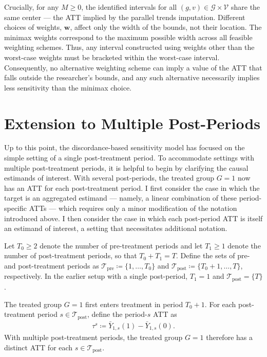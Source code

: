 \documentclass[twoside,11pt]{article}
\begin{document}
Crucially, for any $M \geq 0$, the identified intervals for all $(g,v) \in \mathcal{G} \times \mathcal{V}$ share the same center --- the \textrm{ATT} implied by the parallel trends imputation. Different choices of weights, $\bm{w}$, affect only the width of the bounds, not their location. The minimax weights correspond to the maximum possible width across all feasible weighting schemes. Thus, any interval constructed using weights other than the worst-case weights must be bracketed within the worst-case interval. Consequently, no alternative weighting scheme can imply a value of the \textrm{ATT} that falls outside the researcher's bounds, and any such alternative necessarily implies less sensitivity than the minimax choice.

\section{Extension to Multiple Post-Periods}  \label{sec: multiple post periods}

Up to this point, the discordance-based sensitivity model has focused on the simple setting of a single post-treatment period. To accommodate settings with multiple post-treatment periods, it is helpful to begin by clarifying the causal estimands of interest. With several post-periods, the treated group $G = 1$ now has an \textrm{ATT} for each post-treatment period. I first consider the case in which the target is an aggregated estimand --- namely, a linear combination of these period-specific \textrm{ATT}s --- which requires only a minor modification of the notation introduced above. I then consider the case in which each post-period \textrm{ATT} is itself an estimand of interest, a setting that necessitates additional notation.

Let $T_0 \geq 2$ denote the number of pre-treatment periods and let $T_1 \geq 1$ denote the number of post-treatment periods, so that $T_0 + T_1 = T$. Define the sets of pre- and post-treatment periods as $\mathcal{T}_{\mathrm{pre}} \coloneqq \{1, \ldots, T_0\}$ and $\mathcal{T}_{\mathrm{post}} \coloneqq \{T_0 + 1, \ldots, T\}$, respectively. In the earlier setup with a single post-period, $T_1 = 1$ and $\mathcal{T}_{\mathrm{post}} = \{T\}$.

The treated group $G = 1$ first enters treatment in period $T_0 + 1$. For each post-treatment period $s \in \mathcal{T}_{\mathrm{post}}$, define the period-$s$ \textrm{ATT} as
\begin{align}
\tau^s \coloneqq \bar{Y}_{1,s}(1) - \bar{Y}_{1,s}(0).
\end{align}
With multiple post-treatment periods, the treated group $G = 1$ therefore has a distinct \textrm{ATT} for each $s \in \mathcal{T}_{\mathrm{post}}$.
\end{document}
